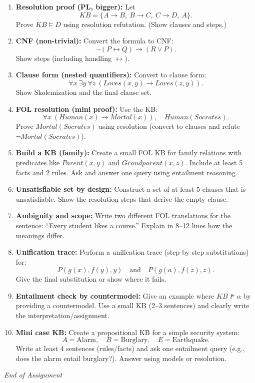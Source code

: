 \documentclass[11pt,a4paper]{article}
\begin{document}
\begin{enumerate}[label=H\arabic*., leftmargin=*]
  \item \textbf{Resolution proof (PL, bigger):} Let
    \[
      KB=\{A \rightarrow B,\ B \rightarrow C,\ C \rightarrow D,\ A\}.
    \]
    Prove $KB \models D$ using resolution refutation. (Show clauses and steps.)

  \item \textbf{CNF (non-trivial):} Convert the formula to CNF:
    \[
      \lnot(P \leftrightarrow Q) \rightarrow (R \lor P).
    \]
    Show steps (including handling $\leftrightarrow$).

  \item \textbf{Clause form (nested quantifiers):} Convert to clause form:
    \[
      \forall x\ \exists y\ \forall z\ (Loves(x,y) \rightarrow Loves(z,y)).
    \]
    Show Skolemization and the final clause set.

  \item \textbf{FOL resolution (mini proof):} Use the KB:
    \[
      \forall x\ (Human(x) \rightarrow Mortal(x)),\quad Human(Socrates).
    \]
    Prove $Mortal(Socrates)$ using resolution (convert to clauses and refute $\lnot Mortal(Socrates)$).

  \item \textbf{Build a KB (family):} Create a small FOL KB for family relations with predicates like
    $Parent(x,y)$ and $Grandparent(x,z)$.
    Include at least 5 facts and 2 rules. Ask and answer one query using entailment reasoning.

  \item \textbf{Unsatisfiable set by design:} Construct a set of at least 5 clauses that is unsatisfiable.
    Show the resolution steps that derive the empty clause.

  \item \textbf{Ambiguity and scope:} Write two different FOL translations for the sentence:
    ``Every student likes a course.''
    Explain in 8--12 lines how the meanings differ.

  \item \textbf{Unification trace:} Perform a unification trace (step-by-step substitutions) for:
    \[
      P(g(x), f(y), y) \quad \text{and} \quad P(g(a), f(z), z).
    \]
    Give the final substitution or show where it fails.

  \item \textbf{Entailment check by countermodel:} Give an example where $KB \not\models \alpha$ by providing a countermodel.
    Use a small KB (2--3 sentences) and clearly write the interpretation/assignment.

  \item \textbf{Mini case KB:} Create a propositional KB for a simple security system:
    \[
      A=\text{Alarm},\quad B=\text{Burglary},\quad E=\text{Earthquake}.
    \]
    Write at least 4 sentences (rules/facts) and ask one entailment query (e.g., does the alarm entail burglary?).
    Answer using models or resolution.
\end{enumerate}

\vfill
\noindent\textit{End of Assignment}
\end{document}
